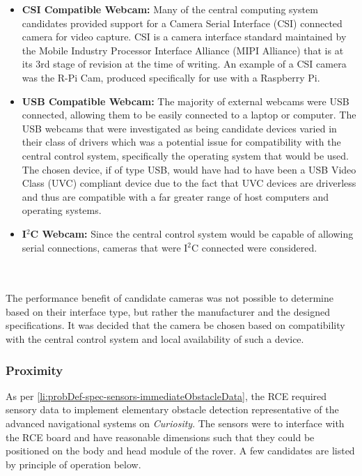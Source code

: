       \begin{itemize}
        \item \textbf{CSI Compatible Webcam:} Many of the central computing system candidates provided support for a Camera Serial Interface (CSI) connected camera for video capture. CSI is a camera interface standard maintained by the Mobile Industry Processor Interface Alliance (MIPI Alliance) that is at its 3rd stage of revision at the time of writing. An example of a CSI camera was the R-Pi Cam, produced specifically for use with a Raspberry Pi.
        \item \textbf{USB Compatible Webcam:} The majority of external webcams were USB connected, allowing them to be easily connected to a laptop or computer. The USB webcams that were investigated as being candidate devices varied in their class of drivers which was a potential issue for compatibility with the central control system, specifically the operating system that would be used. The chosen device, if of type USB, would have had to have been a USB Video Class (UVC) compliant device due to the fact that UVC devices are driverless and thus are compatible with a far greater range of host computers and operating systems.
        \item \textbf{I$^2$C Webcam:} Since the central control system would be capable of allowing serial connections, cameras that were I$^2$C connected were considered.
      \end{itemize}
      
      \\\\
        The performance benefit of candidate cameras was not possible to determine based on their interface type, but rather the manufacturer and the designed specifications. It was decided that the camera be chosen based on compatibility with the central control system and local availability of such a device.
      
    \subsubsection{Proximity}
      As per \ref{li:probDef-spec-sensors-immediateObstacleData}, the RCE required sensory data to implement elementary obstacle detection representative of the advanced navigational systems on \textit{Curiosity}. The sensors were to interface with the RCE board and have reasonable dimensions such that they could be positioned on the body and head module of the rover. A few candidates are listed by principle of operation below.
      
